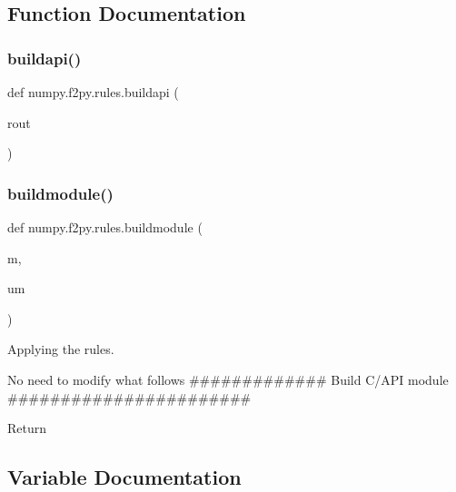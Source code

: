 \subsection{Function Documentation}
\mbox{\label{namespacenumpy_1_1f2py_1_1rules_a35634bf0571e3a8ffd2dde6413a8644b}} 
\subsubsection{\texorpdfstring{buildapi()}{buildapi()}}
{\footnotesize\ttfamily def numpy.\+f2py.\+rules.\+buildapi (\begin{DoxyParamCaption}\item[{}]{rout }\end{DoxyParamCaption})}

\mbox{\label{namespacenumpy_1_1f2py_1_1rules_a98429075834911d2ae9726fc30420a92}} 
\subsubsection{\texorpdfstring{buildmodule()}{buildmodule()}}
{\footnotesize\ttfamily def numpy.\+f2py.\+rules.\+buildmodule (\begin{DoxyParamCaption}\item[{}]{m,  }\item[{}]{um }\end{DoxyParamCaption})}



Applying the rules. 

No need to modify what follows \#\#\#\#\#\#\#\#\#\#\#\#\# Build C/\+A\+PI module \#\#\#\#\#\#\#\#\#\#\#\#\#\#\#\#\#\#\#\#\#\#\# \begin{DoxyVerb}Return
\end{DoxyVerb}
 

\subsection{Variable Documentation}
\mbox{\label{namespacenumpy_1_1f2py_1_1rules_ab88801f33f30bc38f1fd5e915a195f9b}} 
